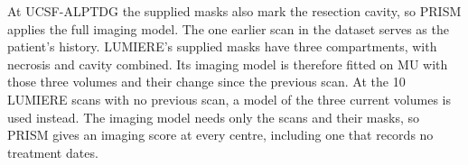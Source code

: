 At UCSF-ALPTDG the supplied masks also mark the resection cavity, so PRISM applies the full imaging model. The one
earlier scan in the dataset serves as the patient's history. LUMIERE's supplied masks have three compartments, with
necrosis and cavity combined. Its imaging model is therefore fitted on MU with those three volumes and their change
since the previous scan. At the 10 LUMIERE scans with no previous scan, a model of the three current volumes is used
instead. The imaging model needs only the scans and their masks, so PRISM gives an imaging score at every centre,
including one that records no treatment dates.

